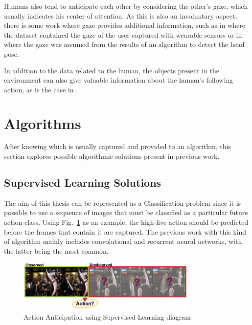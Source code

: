 Humans also tend to anticipate each other by considering the other's gaze, which usually indicates his center of attention. As this is also an involuntary aspect, there is some work where gaze provides additional information, such as in \cite{Schydlo2018} where the dataset contained the gaze of the user captured with wearable sensors or in \cite{Canuto2021} where the gaze was assumed from the results of an algorithm to detect the head pose.

In addition to the data related to the human, the objects present in the environment can also give valuable information about the human's following action, as is the case in \cite{Furnari2021}.

\section{Algorithms}

After knowing which is usually captured and provided to an algorithm, this section explores possible algorithmic solutions present in previous work.

\subsection{Supervised Learning Solutions}

The aim of this thesis can be represented as a Classification problem since it is possible to use a sequence of images that must be classified as a particular future action class. Using Fig.~\ref{superviseddiagram} as an example, the high-five action should be predicted before the frames that contain it are captured. The previous work with this kind of algorithm mainly includes convolutional and recurrent neural networks, with the latter being the most common.

\begin{figure}[H]
\centerline{\includegraphics[width=3.5in]{figs/superviseddiagram.PNG}}
\caption{Action Anticipation using Supervised Learning diagram\cite{Gammulle2019}}
\label{superviseddiagram}
\end{figure}

